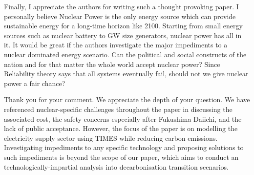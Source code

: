 \documentclass[answers,11pt]{exam}
\begin{document}
\begin{questions}
\begin{solution}
                 
        \end{solution} 
                        \question   Finally, I appreciate the authors for writing such a  thought provoking paper. I personally believe Nuclear Power is the only energy source which can provide sustainable energy for a long-time horizon like 2100. Starting from small energy sources such as nuclear battery to GW size generators, nuclear power has all in it. It would be great if the authors investigate the major impediments to a nuclear dominated energy scenario. Can the political and social constructs of the nation and for that matter the whole world accept nuclear power? Since Reliability theory says that all systems eventually fail, should not we give nuclear power a fair chance?  
                                
        \begin{solution}
        
                 Thank you for your comment. We appreciate the depth of your question. We have referenced nuclear-specific challenges throughout the paper in discussing the associated cost, the safety concerns especially after Fukushima-Daiichi, and the lack of public acceptance. However, the focus of the paper is on modelling the electricity supply sector using TIMES while reducing carbon emissions. Investigating impediments to any specific technology and proposing solutions to such impediments is beyond the scope of our paper, which aims to conduct an technologically-impartial analysis into decarbonisation transition scenarios.
                 
                 
        \end{solution} 
\end{questions}
%
%
\end{document}
